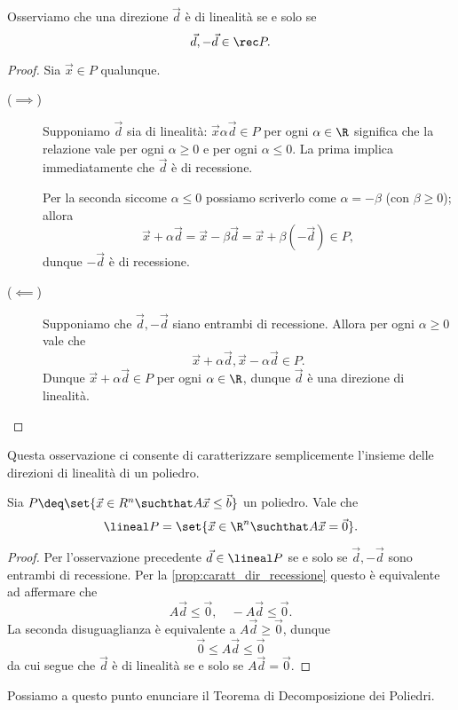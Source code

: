 Osserviamo che una direzione $\vec d$ è di linealità se e solo se \[
    \vec d, -\vec d \in \rec P.    
\] \begin{proof} 
    Sia $\vec x \in P$ qualunque.
    \begin{description} 
        \item[($\implies$)] Supponiamo $\vec d$ sia di linealità: $\vec x \alpha\vec d \in P$ per ogni $\alpha \in \R$ significa che la relazione vale per ogni $\alpha \geq 0$ e per ogni $\alpha \leq 0$. La prima implica immediatamente che $\vec d$ è di recessione. 
        
        Per la seconda siccome $\alpha \leq 0$ possiamo scriverlo come $\alpha = -\beta$ (con $\beta \geq 0$); allora \[
            \vec x + \alpha\vec d = \vec x - \beta\vec d = \vec x + \beta(-\vec d) \in P,
        \] dunque $-\vec d$ è di recessione.
        \item[($\impliedby$)] Supponiamo che $\vec d, -\vec d$ siano entrambi di recessione. Allora per ogni $\alpha \geq 0$ vale che \[
            \vec x + \alpha\vec d, \vec x - \alpha\vec d \in P.    
        \] Dunque $\vec x + \alpha\vec d \in P$ per ogni $\alpha \in \R$, dunque $\vec d$ è una direzione di linealità.
    \end{description}
\end{proof}

Questa osservazione ci consente di caratterizzare semplicemente l'insieme delle direzioni di linealità di un poliedro.

\begin{proposition}
    Sia $P \deq \set{\vec x \in R^n \suchthat A\vec x \leq \vec b}$ un poliedro. Vale che \begin{equation}
        \lineal P = \set{\vec x \in \R^n \suchthat A\vec x = \vec 0}.    
    \end{equation}
\end{proposition}
\begin{proof}
    Per l'osservazione precedente $\vec d \in \lineal P$ se e solo se $\vec d, -\vec d$ sono entrambi di recessione. Per la \autoref{prop:caratt_dir_recessione} questo è equivalente ad affermare che \[
        A\vec d \leq \vec 0, \quad -A\vec d \leq \vec 0.
    \] La seconda disuguaglianza è equivalente a $A\vec d \geq \vec 0$, dunque \[
        \vec 0 \leq A\vec d \leq \vec 0    
    \] da cui segue che $\vec d$ è di linealità se e solo se $A\vec d = \vec 0$.
\end{proof}

Possiamo a questo punto enunciare il Teorema di Decomposizione dei Poliedri.

